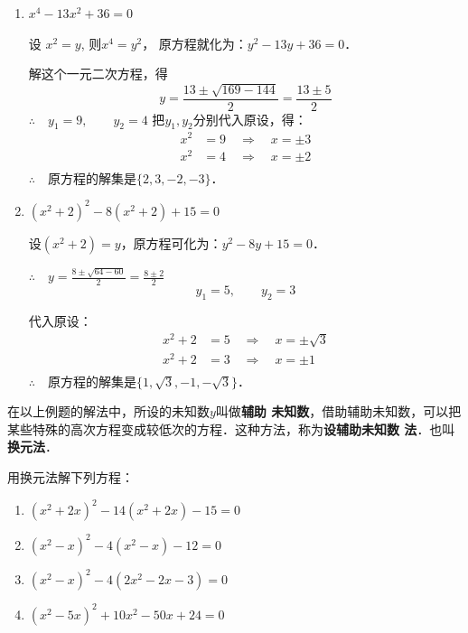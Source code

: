 \begin{solution}
\begin{enumerate}
    \item $x^4-13x^2+36=0$

    设 $x^2=y$, 则$x^4=y^2$，
    原方程就化为：$y^2-13y+36=0$．

    解这个一元二次方程，得
\[y=\frac{13\pm \sqrt{169-144}}{2}=\frac{13\pm 5}{2}\]
$\therefore\quad y_1=9,\qquad y_2=4$
把$y_1,y_2$分别代入原设，得：
\begin{align*}
    x^2&=9 \quad \Rightarrow\quad  x=\pm 3\\
    x^2&=4 \quad \Rightarrow\quad  x=\pm 2\\
\end{align*}
$\therefore\quad $原方程的解集是$\{2,3,-2,-3\}$．

\item $(x^2+2)^2-8(x^2+2)+15=0$

设$(x^2+2)=y$，原方程可化为：$y^2-8y+15=0$．

$\therefore\quad y=\frac{8\pm\sqrt{64-60}}{2}=\frac{8\pm 2}{2}$
\[y_1=5,\qquad y_2=3\]

代入原设：
\begin{align*}
    x^2+2&=5 \quad \Rightarrow\quad  x=\pm\sqrt{3}\\
    x^2+2&=3 \quad \Rightarrow\quad  x=\pm 1\\
\end{align*}
$\therefore\quad $原方程的解集是$\{1,\sqrt{3},-1,-\sqrt{3}\}$．

\end{enumerate}    
\end{solution}

在以上例题的解法中，所设的未知数$y$叫做\textbf{辅助
未知数}，借助辅助未知数，可以把某些特殊的高次方程变成较低次的方程．这种方法，称为\textbf{设辅助未知数
法}．也叫\textbf{换元法}．

\begin{ex}
    用换元法解下列方程：
    
\begin{enumerate}
    \item $(x^2+2x)^2-14(x^2+2x)-15=0$
    \item $(x^2-x)^2-4(x^2-x)-12=0$
    \item $(x^2-x)^2-4(2x^2-2x-3)=0$
    \item $(x^2-5x)^2+10x^2-50x+24=0$
\end{enumerate}        
    

\end{ex}

